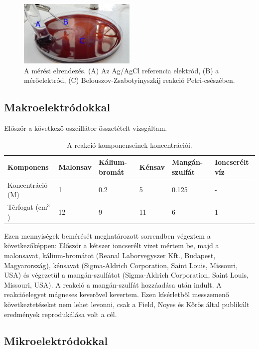 \begin{figure}[!h]
\centering
\includegraphics[width=0.5\textwidth]{img/setup.png}
\caption{A mérési elrendezés. (A) Az Ag/AgCl referencia elektród, (B) a mérőelektród, (C) Belouszov-Zsabotyinyszkij reakció Petri-csészében.}
\label{fig:setup}
\end{figure}


\subsection{Makroelektródokkal}
Először a következő oszcillátor összetételt vizsgáltam.
\begin{table}[h!]
\centering
\caption{A reakció komponenseinek koncentrációi.}
\small
\label{my-label}
\begin{tabular}{llllll}
Komponens                       & Malonsav & Kálium-bromát & Kénsav & Mangán-szulfát & Ioncserélt víz \\
\hline
Koncentráció (M)                & 1        & 0.2           & 5      & 0.125          & -              \\
Térfogat (cm$^3$) & 12       & 9             & 11     & 6              & 1              \\
\end{tabular}
\normalsize
\end{table}
Ezen mennyiségek bemérését meghatározott sorrendben végeztem a következőképpen: Először a kétszer ioncserélt vizet mértem be, majd a malonsavat, kálium-bromátot (Reanal Laborvegyszer Kft., Budapest, Magyarország), kénsavat (Sigma-Aldrich Corporation, Saint Louis, Missouri, USA) és végezetül a mangán-szulfátot (Sigma-Aldrich Corporation, Saint Louis, Missouri, USA). A reakció a mangán-szulfát hozzáadása után indult. A reakcióelegyet mágneses keverővel kevertem. Ezen kísérletből messzemenő következtetéseket nem lehet levonni, csak a Field, Noyes és Kőrös által publikált eredmények reprodukálása \cite{noyes1972oscillations} volt a cél.

\subsection{Mikroelektródokkal} \label{mikroelektrod}

